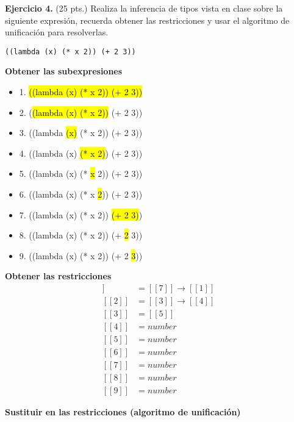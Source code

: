 \textbf{Ejercicio 4.} (25 pts.) Realiza la inferencia de tipos vista en clase sobre la siguiente expresión, recuerda obtener las restricciones y usar el algoritmo de unificación para resolverlas. \vspace{0.3cm}

\begin{lstlisting}
((lambda (x) (* x 2)) (+ 2 3))
\end{lstlisting}

\textbf{Obtener las subexpresiones} \vspace{0.3cm}

\begin{itemize}
    \item 1. \hl{((lambda (x) (* x 2)) (+ 2 3))}
    \item 2. (\hl{(lambda (x) (* x 2))} (+ 2 3))
    \item 3. ((lambda \hl{(x)} (* x 2)) (+ 2 3))
    \item 4. ((lambda (x) \hl{(* x 2)}) (+ 2 3))
    \item 5. ((lambda (x) (* \hl{x} 2)) (+ 2 3))
    \item 6. ((lambda (x) (* x \hl{2})) (+ 2 3))
    \item 7. ((lambda (x) (* x 2)) \hl{(+ 2 3)})
    \item 8. ((lambda (x) (* x 2)) (+ \hl{2} 3))
    \item 9. ((lambda (x) (* x 2)) (+ 2 \hl{3}))
\end{itemize}

\textbf{Obtener las restricciones}
\begin{align*}
    [[2]] &= [[7]] \rightarrow [[1]] \\
    [[2]] &= [[3]] \rightarrow [[4]] \\
    [[3]] &= [[5]] \\ 
    [[4]] &= number \\
    [[5]] &= number \\
    [[6]] &= number \\
    [[7]] &= number \\
    [[8]] &= number \\
    [[9]] &= number
\end{align*}

\textbf{Sustituir en las restricciones (algoritmo de unificación)} \vspace{0.3cm}

